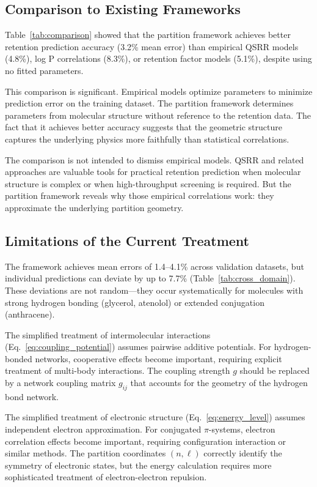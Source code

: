\documentclass[twocolumn,superscriptaddress,prb,10pt]{revtex4-2}
\begin{document}
\subsection{Comparison to Existing Frameworks}

Table~\ref{tab:comparison} showed that the partition framework achieves better retention prediction accuracy (3.2\% mean error) than empirical QSRR models (4.8\%), log P correlations (8.3\%), or retention factor models (5.1\%), despite using no fitted parameters.

This comparison is significant. Empirical models optimize parameters to minimize prediction error on the training dataset. The partition framework determines parameters from molecular structure without reference to the retention data. The fact that it achieves better accuracy suggests that the geometric structure captures the underlying physics more faithfully than statistical correlations.

The comparison is not intended to dismiss empirical models. QSRR and related approaches are valuable tools for practical retention prediction when molecular structure is complex or when high-throughput screening is required. But the partition framework reveals why those empirical correlations work: they approximate the underlying partition geometry.

\subsection{Limitations of the Current Treatment}

The framework achieves mean errors of 1.4–4.1\% across validation datasets, but individual predictions can deviate by up to 7.7\% (Table~\ref{tab:cross_domain}). These deviations are not random—they occur systematically for molecules with strong hydrogen bonding (glycerol, atenolol) or extended conjugation (anthracene).

The simplified treatment of intermolecular interactions (Eq.~\ref{eq:coupling_potential}) assumes pairwise additive potentials. For hydrogen-bonded networks, cooperative effects become important, requiring explicit treatment of multi-body interactions. The coupling strength $g$ should be replaced by a network coupling matrix $g_{ij}$ that accounts for the geometry of the hydrogen bond network.

The simplified treatment of electronic structure (Eq.~\ref{eq:energy_level}) assumes independent electron approximation. For conjugated $\pi$-systems, electron correlation effects become important, requiring configuration interaction or similar methods. The partition coordinates $(n, \ell)$ correctly identify the symmetry of electronic states, but the energy calculation requires more sophisticated treatment of electron-electron repulsion.
\end{document}
